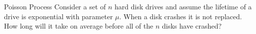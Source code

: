 \begin{problem}{Poisson Process}
Consider a set of $n$ hard disk drives and assume the lifetime of a drive is exponential with parameter $\mu$. When a disk crashes it is not replaced. How long will it take on average before all of the $n$ disks have crashed?
\end{problem}

